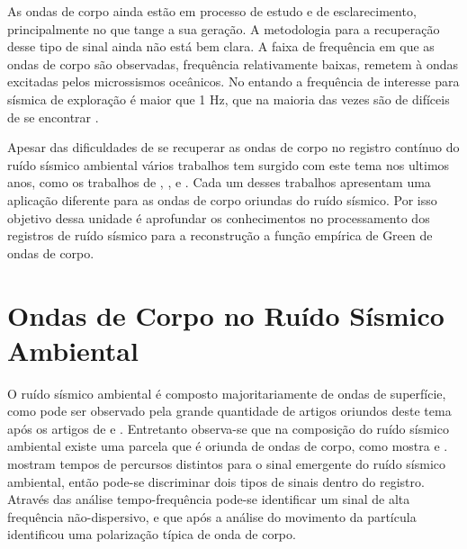 \documentclass[paper,twocolumn]{geophysics}
\begin{document}
As ondas de corpo ainda estão em processo de estudo e de esclarecimento, principalmente no que tange a sua geração. A metodologia para a recuperação desse tipo de sinal ainda não está bem clara. A faixa de frequência em que as ondas de corpo são observadas, frequência relativamente baixas,  remetem à ondas excitadas pelos microssismos oceânicos. No entando a frequência de interesse  para sísmica de exploração é maior que 1 Hz, que na maioria das vezes são de difíceis de se encontrar \citep{wapenaar_tutorial_2010}.

Apesar das dificuldades de se recuperar as ondas de corpo no registro contínuo do ruído sísmico ambiental vários trabalhos tem surgido com este tema nos ultimos anos, como os trabalhos de \cite{roux_p-waves_2005}, \cite{prieto_amplitude_2011}, \cite{poli_emergence_2012} e \cite{boue_teleseismic_2013}. Cada um desses trabalhos apresentam uma aplicação diferente para as ondas de corpo oriundas do ruído sísmico. Por isso objetivo dessa unidade é aprofundar os conhecimentos no processamento dos registros de ruído sísmico para a reconstrução a função empírica de Green de ondas de corpo. 

\section*{Ondas de Corpo no Ruído Sísmico Ambiental}

O ruído sísmico ambiental é composto majoritariamente de ondas de superfície, como pode ser observado pela grande quantidade de artigos oriundos deste tema após os artigos de \cite{campillo_long-range_2003} e \cite{shapiro_emergence_2004}. Entretanto observa-se que na composição do ruído sísmico ambiental existe uma parcela que é oriunda de ondas de corpo, como mostra \cite{roux_p-waves_2005} e \cite{poli_emergence_2012}. \cite{roux_p-waves_2005} mostram tempos de percursos distintos para o sinal emergente do ruído sísmico ambiental, então pode-se discriminar dois tipos de sinais dentro do registro. Através das análise tempo-frequência pode-se identificar um sinal de alta frequência não-dispersivo, e que após a análise do movimento da partícula identificou uma polarização típica de onda de corpo.
\end{document}

